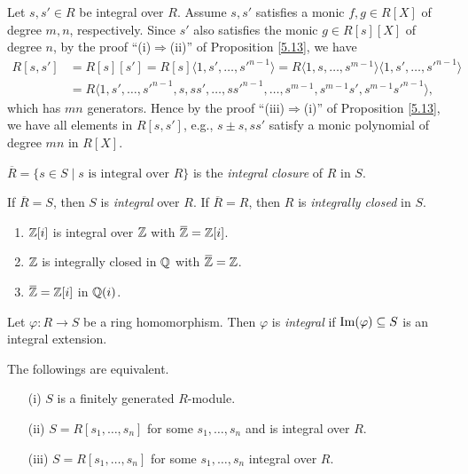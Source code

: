 \begin{note*}
    Let $s,s' \in R$ be integral over $R$. Assume $s,s'$ satisfies a monic $f,g \in R[X]$ of degree $m,n$, respectively. Since $s'$ also satisfies the monic $g \in R[s][X]$ of degree $n$, by the proof ``(i)$\Rightarrow$(ii)'' of Proposition \ref{5.13}, we have
    \begin{align*}
        R[s,s'] &= R[s][s'] = R[s]\langle 1,s',\ldots,s'^{n-1} \rangle = R\langle 1,s,\ldots,s^{m-1} \rangle \langle 1,s',\ldots,s'^{n-1} \rangle \\
        &= R\langle 1,s',\ldots,s'^{n-1},s,ss',\ldots,ss'^{n-1},\ldots,s^{m-1},s^{m-1}s',s^{m-1}s'^{n-1} \rangle,
    \end{align*}
    which has $mn$ generators. Hence by the proof ``(iii)$\Rightarrow$(i)'' of Proposition \ref{5.13}, we have all elements in $R[s,s']$, e.g., $s \pm s,ss'$ satisfy a monic polynomial of degree $mn$ in $R[X]$.
\end{note*}

\begin{definition}\label{5.16}
    $\overbar{R} = \{s \in S \mid s \text{ is integral over }R\}$ is the \emph{integral closure} of $R$ in $S$. \par 
    If $\overbar{R} = S$, then $S$ is \emph{integral} over $R$. If $\overbar{R} = R$, then $R$ is \emph{integrally closed} in $S$.
\end{definition}

\begin{example}\label{5.17}
    \begin{enumerate}
        \item $\mathbb{Z}[i]$ is integral over $\mathbb{Z}$ with $\overbar{\bbZ} = \bbZ[i]$.
        \item $\mathbb{Z}$ is integrally closed in $\mathbb{Q}$ with $\overbar{\bbZ} = \bbZ$. 
        \item $\overbar{\bbZ} = \bbZ[i]$ in $\mathbb{Q}(i)$.
    \end{enumerate}
\end{example}

\begin{definition}\label{5.18}
    Let $\varphi: R \to S$ be a ring homomorphism. Then $\varphi$ is \emph{integral} if $\operatorname{Im}(\varphi) \subseteq S$ is an integral extension.
\end{definition}

\begin{theorem}\label{5.19}
    The followings are equivalent.
    \begin{enumerate}
        \item[(i)]
            $S$ is a finitely generated $R$-module.
        \item[(ii)]
            $S = R[s_1,\ldots,s_n]$ for some $s_1,\ldots,s_n$ and is integral over $R$. 
        \item[(iii)] $S = R[s_1,\ldots,s_n]$ for some $s_1,\ldots,s_n$ integral over $R$.
    \end{enumerate}
\end{theorem}

